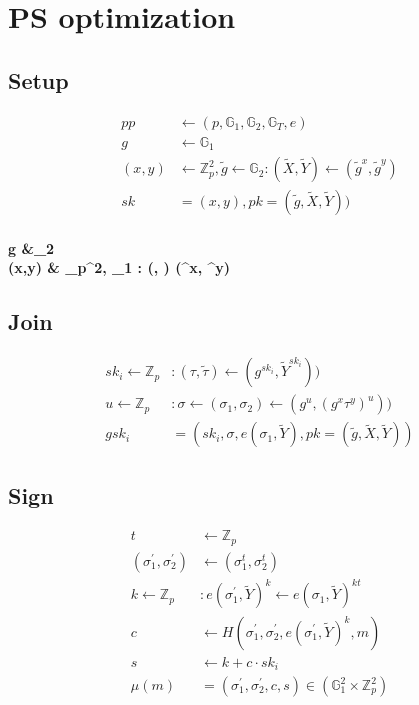 \documentclass[11pt]{article}
\begin{document}
    \section{PS optimization}

    \subsection{Setup}
    \begin{align}
        pp  & \leftarrow (p,\mathbb{G}_1,\mathbb{G}_2,\mathbb{G}_T,e) \\
        g &\leftarrow \mathbb{G}_1\\
        (x,y) &  \leftarrow \mathbb{Z}_p^{2}, \tilde{g} \leftarrow \mathbb{G}_2 :
        (\tilde{X}, \tilde{Y})  \leftarrow (\tilde{g}^x, \tilde{g}^y)\\
        sk &=(x,y), pk=(\tilde{g}, \tilde{X}, \tilde{Y}))
    \end{align}

    \paragraph{\color{blue}
    g &\leftarrow {}_2\\
    (x,y) &  \leftarrow {}_p^{2},  \leftarrow {}_1 :
        (, )  \leftarrow (^x, ^y)\\
    }
    \subsection{Join}
    \begin{align}
        sk_i \leftarrow \mathbb{Z}_p &:
        (\tau, \tilde{\tau})\leftarrow (g^{sk_i}, \tilde{Y}^{sk_i}))\\
        u \leftarrow \mathbb{Z}_p &: \sigma \leftarrow(\sigma_1, \sigma_2) \leftarrow (g^u, (g^x \tau^y )^u))\\
        gsk_i &=(sk_i,\sigma, e(\sigma_1, \tilde{Y}), pk=(\tilde{g}, \tilde{X}, \tilde{Y}))
    \end{align}

    \subsection{Sign}
    \begin{align}
        t &\leftarrow \mathbb{Z}_p\\
    (\sigma_1^{\prime}, \sigma_2^{\prime})
        &\leftarrow (\sigma_1^t, \sigma_2^t)\\
        k \leftarrow \mathbb{Z}_p &: e(\sigma_1^{\prime}, \tilde{Y})^k \leftarrow e(\sigma_1, \tilde{Y})^{kt} \\
        c &\leftarrow H(\sigma_1^{\prime}, \sigma_2^{\prime}, e(\sigma_1^{\prime}, \tilde{Y})^{k}, m)\\
        s &\leftarrow k+ c \cdot sk_i \\
        \mu(m) &=(\sigma_1^{\prime}, \sigma_2^{\prime}, c, s) \in (\mathbb{G}_1^2 \times \mathbb{Z}_p^2)
    \end{align}
\end{document}
